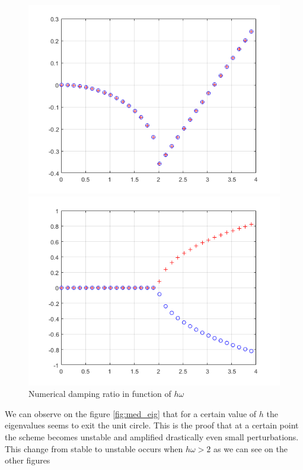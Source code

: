 \begin{figure}[H]
\begin{minipage}[b]{0.475\textwidth}
    \centering 
    \includegraphics[width=\textwidth]{images/med_period.png}
    \caption[]%
    {{\small relative periodicity error in function of $h\omega$}}    
    \label{fig:med_relat_per}
\end{minipage}
\quad
\begin{minipage}[b]{0.475\textwidth}   
    \centering 
    \includegraphics[width=\textwidth]{images/med_damp.png}
    \caption[]%
    {{\small Numerical damping ratio in function of $h\omega$}}    
    \label{fig:med_damp}
\end{minipage}
\end{figure}
We can observe on the figure \ref{fig:med_eig} that for a certain value of $h$ the eigenvalues seems to exit the unit circle. This is the proof that at a certain point the scheme becomes unstable and amplified drastically even small perturbations. This change from stable to unstable occurs when $h\omega > 2$ as we can see on the other figures




